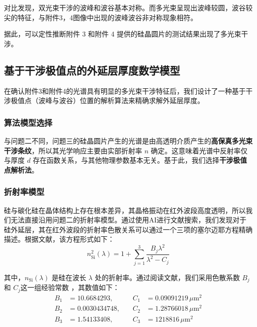 \documentclass[a4paper]{ctexart}
\begin{document}
对比发现，双光束干涉的波峰和波谷基本对称。而多光束呈现出波峰较圆，波谷较尖的特征，与附件3，4图像中出现的波峰波谷非对称现象相符。

据此，可以定性推断附件 3 和附件 4 提供的硅晶圆片的测试结果出现了多光束干涉。\\


\subsection{基于干涉极值点的外延层厚度数学模型}
在确认附件3和附件4的光谱具有明显的多光束干涉特征后，我们设计了一种基于干涉极值点（波峰与波谷）位置的解析算法来精确求解外延层厚度。
\subsubsection{算法模型选择}
与问题二不同，问题三的硅晶圆片产生的光谱是由高透明介质产生的\textbf{高保真多光束干涉条纹}，所以其光学响应主要由实部折射率 $n$ 确定。这意味着光谱中反射率仅与厚度 $d$ 存在函数关系，与其他物理参数基本无关。基于此，我们选择\textbf{干涉极值点解析法}。

\subsubsection{折射率模型}

硅与碳化硅在晶体结构上存在根本差异，其晶格振动在红外波段高度透明，所以我们无法直接沿用问题二的折射率模型。通过使用AI\cite{ai:gemini}进行文献搜索，我们发现对于硅外延层，其在红外波段的折射率色散关系可以通过一个三项的塞尔迈耶方程精确描述。根据文献\cite{li1980refractive}，该方程形式如下：
\begin{equation}
    n_{\text{Si}}^2(\lambda) = 1 + \sum_{j=1}^{3} \frac{B_j \lambda^2}{\lambda^2 - C_j}
    \label{eq:sellmeier_si_3term}
\end{equation}

其中，$n_{\text{Si}}(\lambda)$ 是硅在波长 $\lambda$ 处的折射率。通过阅读文献，我们采用色散系数 $B_j$ 和 $C_j$这一组经验常数 ，其数值如下：
\begin{align*}
    B_1 &= 10.6684293,   &\quad C_1 &= 0.09091219 \, \mu\text{m}^2 \\
    B_2 &= 0.0030434748,  &\quad C_2 &= 1.28766018 \, \mu\text{m}^2 \\
    B_3 &= 1.54133408,    &\quad C_3 &= 1218816    \, \mu\text{m}^2
\end{align*}
\end{document}

